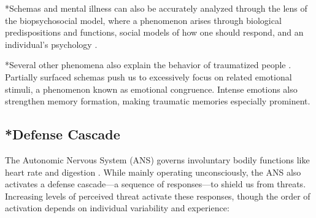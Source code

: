 \documentclass[12pt,letterpaper]{article}
\begin{document}
*Schemas and mental illness can also be accurately analyzed through the lens of the biopsychosocial model, where a phenomenon arises through biological predispositions and functions, social models of how one should respond, and an individual's psychology \cite{wadeBiopsychosocial}.

*Several other phenomena also explain the behavior of traumatized people \cite{laneReconsolidation}. Partially surfaced schemas push us to excessively focus on related emotional stimuli, a phenomenon known as emotional congruence. Intense emotions also strengthen memory formation, making traumatic memories especially prominent.
\subsection{*Defense Cascade}
The Autonomic Nervous System (ANS) governs involuntary bodily functions like heart rate and digestion \cite{kozlowskaDefenseCascade}. While mainly operating unconsciously, the ANS also activates a defense cascade—a sequence of responses—to shield us from threats. Increasing levels of perceived threat activate these responses, though the order of activation depends on individual variability and experience:
\end{document}
